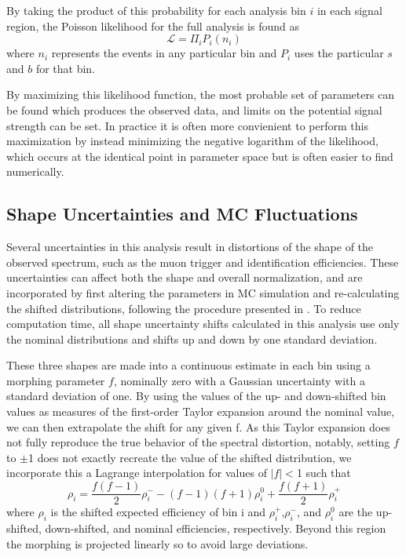 By taking the product of this probability for each analysis bin $i$ in each signal region, the Poisson likelihood for the full analysis is found as
\begin{equation}
	\mathcal{L} = \Pi_{i} P_i (n_i)
\end{equation}
where $n_i$ represents the events in any particular bin and $P_i$ uses the particular $s$ and $b$ for that bin.

By maximizing this likelihood function, the most probable set of parameters can be found which produces the observed data, and limits on the potential signal strength can be set.
In practice it is often more convienient to perform this maximization by instead minimizing the negative logarithm of the likelihood, which occurs at the identical point in parameter space but is often easier to find numerically.

\subsection{Shape Uncertainties and MC Fluctuations}
Several uncertainties in this analysis result in distortions of the shape of the observed spectrum, such as the muon trigger and identification efficiencies.
These uncertainties can affect both the shape and overall normalization, and are incorporated by first altering the parameters in MC simulation and re-calculating the shifted distributions, following the procedure presented in \cite{conway2011}.
To reduce computation time, all shape uncertainty shifts calculated in this analysis use only the nominal distributions and shifts up and down by one standard deviation.

These three shapes are made into a continuous estimate in each bin using a morphing parameter $f$, nominally zero with a Gaussian uncertainty with a standard deviation of one.
By using the values of the up- and down-shifted bin values as measures of the first-order Taylor expansion around the nominal value, we can then extrapolate the shift for any given f. 
As this Taylor expansion does not fully reproduce the true behavior of the spectral distortion, notably, setting $f$ to $\pm$1 does not exactly recreate the value of the shifted distribution, we incorporate this a Lagrange interpolation for values of $|f|<$1 such that
\begin{equation}
	\rho_i = \frac{f(f-1)}{2}\rho_{i}^{-} - (f-1)(f+1)\rho_{i}^0 + \frac{f(f+1)}{2}\rho_{i}^{+}
\end{equation}
where $\rho_i$ is the shifted expected efficiency of bin i and $\rho_{i}^+$,$\rho_{i}^-$, and $\rho_{i}^0$ are the up-shifted, down-shifted, and nominal efficiencies, respectively.
Beyond this region the morphing is projected linearly so to avoid large deviations. 

